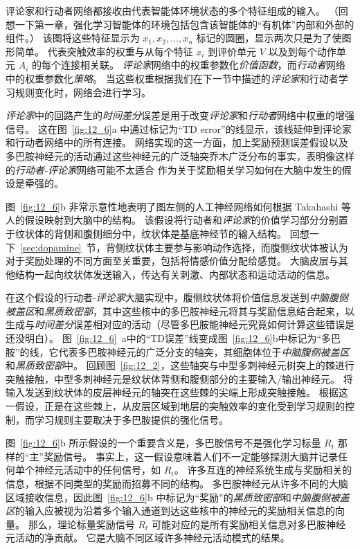 评论家和行动者网络都接收由代表智能体环境状态的多个特征组成的输入。
（回想一下第一章，强化学习智能体的环境包括包含该智能体的“有机体”内部和外部的组件。）
该图将这些特征显示为 $x_1,x_2,...,x_n$ 标记的圆圈，显示两次只是为了使图形简单。
代表突触效率的权重与从每个特征 $x_i$ 到评价单元 $V$ 以及到每个动作单元 $A_i$ 的每个连接相关联。
\textit{评论家}网络中的权重参数化\textit{价值函数}，而\textit{行动者}网络中的权重参数化\textit{策略}。
当这些权重根据我们在下一节中描述的\textit{评论家}和行动者学习规则变化时，网络会进行学习。


\textit{评论家}中的回路产生的\textit{时间差分}误差是用于改变\textit{评论家}和\textit{行动者}网络中权重的增强信号。
这在图~\ref{fig:12_6}a 中通过标记为“TD error”的线显示，该线延伸到评论家和行动者网络中的所有连接。
网络实现的这一方面，加上奖励预测误差假设以及多巴胺神经元的活动通过这些神经元的广泛轴突乔木广泛分布的事实，表明像这样的\textit{行动者-评论家}网络可能不太适合 作为关于奖励相关学习如何在大脑中发生的假设是牵强的。


图~\ref{fig:12_6}b 非常示意性地表明了图左侧的人工神经网络如何根据 Takahashi 等人的假设映射到大脑中的结构\cite{takahashi2008silencing}。
该假设将行动者和\textit{评论家}的价值学习部分分别置于纹状体的背侧和腹侧细分中，纹状体是基底神经节的输入结构。
回想一下~\ref{sec:dopamine}~节，背侧纹状体主要参与影响动作选择，而腹侧纹状体被认为对于奖励处理的不同方面至关重要，包括将情感价值分配给感觉。
大脑皮层与其他结构一起向纹状体发送输入，传达有关刺激、内部状态和运动活动的信息。


在这个假设的行动者-\textit{评论家}大脑实现中，腹侧纹状体将价值信息发送到\textit{中脑腹侧被盖区}和\textit{黑质致密部}，其中这些核中的多巴胺神经元将其与奖励信息结合起来，以生成与\textit{时间差分}误差相对应的活动（尽管多巴胺能神经元究竟如何计算这些错误是 还没明白）。
图~\ref{fig:12_6}~a中的“TD误差”线变成图~\ref{fig:12_6}b中标记为“多巴胺”的线，它代表多巴胺神经元的广泛分支的轴突，其细胞体位于\textit{中脑腹侧被盖区}和\textit{黑质致密部}中。
回顾图~\ref{fig:12_2}，这些轴突与中型多刺神经元树突上的棘进行突触接触，中型多刺神经元是纹状体背侧和腹侧部分的主要输入/输出神经元。
将输入发送到纹状体的皮层神经元的轴突在这些棘的尖端上形成突触接触。
根据这一假设，正是在这些棘上，从皮层区域到地层的突触效率的变化受到学习规则的控制，而学习规则主要取决于多巴胺提供的强化信号。


图~\ref{fig:12_6}b 所示假设的一个重要含义是，多巴胺信号不是强化学习标量 $R_t$ 那样的“主”奖励信号。
事实上，这一假设意味着人们不一定能够探测大脑并记录任何单个神经元活动中的任何信号，如 $R_t$。
许多互连的神经系统生成与奖励相关的信息，根据不同类型的奖励而招募不同的结构。
多巴胺神经元从许多不同的大脑区域接收信息，因此图~\ref{fig:12_6}b 中标记为“奖励”的\textit{黑质致密部}和\textit{中脑腹侧被盖区}的输入应被视为沿着多个输入通道到达这些核中的神经元的奖励相关信息的向量。
那么，理论标量奖励信号 $R_t$ 可能对应的是所有奖励相关信息对多巴胺神经元活动的净贡献。
它是大脑不同区域许多神经元活动模式的结果。



